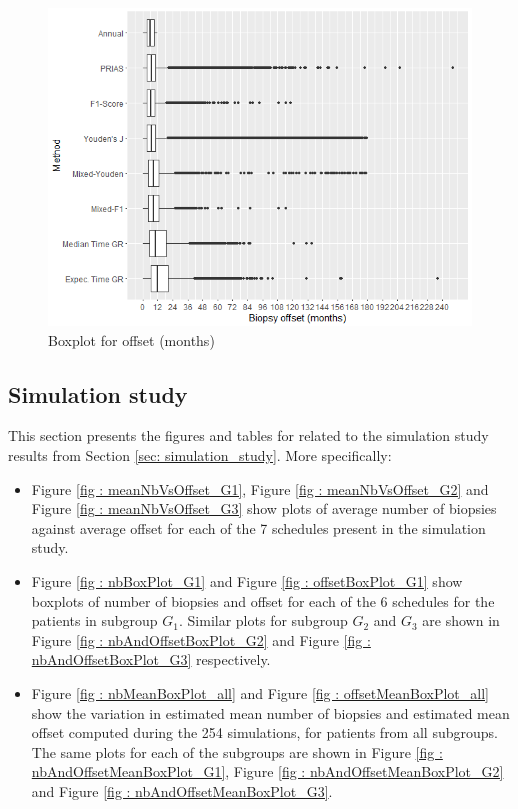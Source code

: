 \begin{figure}
	\centerline{\includegraphics[width=\columnwidth]{images/sim_study/offsetBoxPlot_all.png}}
    \caption{Boxplot for offset (months)}
    \label{fig : offsetBoxPlot}
\end{figure}



\subsection{Simulation study}
This section presents the figures and tables for related to the simulation study results from Section \ref{sec: simulation_study}. More specifically:

\begin{itemize}
  \item Figure \ref{fig : meanNbVsOffset_G1}, Figure \ref{fig : meanNbVsOffset_G2} and Figure \ref{fig : meanNbVsOffset_G3} show plots of average number of biopsies against average offset for each of the 7 schedules present in the simulation study.
  \item Figure \ref{fig : nbBoxPlot_G1} and Figure \ref{fig : offsetBoxPlot_G1} show boxplots of number of biopsies and offset for each of the 6 schedules for the patients in subgroup $G_1$. Similar plots for subgroup $G_2$ and $G_3$ are shown in Figure \ref{fig : nbAndOffsetBoxPlot_G2} and Figure \ref{fig : nbAndOffsetBoxPlot_G3} respectively.
  \item Figure \ref{fig : nbMeanBoxPlot_all} and Figure \ref{fig : offsetMeanBoxPlot_all} show the variation in estimated mean number of biopsies and estimated mean offset computed during the 254 simulations, for patients from all subgroups. The same plots for each of the subgroups are shown in Figure \ref{fig : nbAndOffsetMeanBoxPlot_G1}, Figure \ref{fig : nbAndOffsetMeanBoxPlot_G2} and Figure \ref{fig : nbAndOffsetMeanBoxPlot_G3}.
\end{itemize} 

